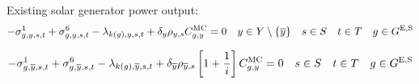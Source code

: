 \documentclass{article}
\begin{document}

Existing solar generator power output:
\begin{equation}
-\dMinPowerOutput + \dMaxPowerOutputSolarExisting - \dPowerBalance[k(\iGenerator),\iYear,\iScenario,\iInterval] + \cDiscountRate \cScenarioDuration\cMarginalCost = 0 \quad \iYear \in \sYears \setminus \{\iYearTerminal\} \quad \iScenario \in \sScenarios \quad \iInterval \in \sIntervals \quad \iGenerator \in \sGeneratorsExistingSolar
\end{equation}

\begin{equation}
-\dMinPowerOutput[\iGenerator,\iYearTerminal,\iScenario,\iInterval] + \dMaxPowerOutputSolarExisting[\iGenerator,\iYearTerminal,\iScenario,\iInterval] - \dPowerBalance[k(\iGenerator),\iYearTerminal,\iScenario,\iInterval] + \cDiscountRate[\iYearTerminal] \cScenarioDuration[\iYearTerminal,\iScenario] \left[1 + \frac{1}{\cInterestRate}\right] \cMarginalCost = 0 \quad \iScenario \in \sScenarios \quad \iInterval \in \sIntervals \quad \iGenerator \in \sGeneratorsExistingSolar
\end{equation}
\end{document}
